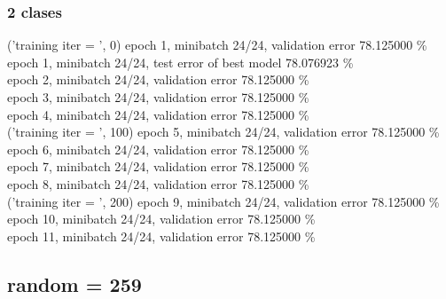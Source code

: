 \documentclass[a4paper]{article}
\begin{document}
\subsubsection{2 clases}
('training \@ iter = ', 0)
epoch 1, minibatch 24/24, validation error 78.125000 \% \\
     epoch 1, minibatch 24/24, test error of best model 78.076923 \% \\
epoch 2, minibatch 24/24, validation error 78.125000 \% \\
epoch 3, minibatch 24/24, validation error 78.125000 \% \\
epoch 4, minibatch 24/24, validation error 78.125000 \% \\
('training \@ iter = ', 100)
epoch 5, minibatch 24/24, validation error 78.125000 \% \\
epoch 6, minibatch 24/24, validation error 78.125000 \% \\
epoch 7, minibatch 24/24, validation error 78.125000 \% \\
epoch 8, minibatch 24/24, validation error 78.125000 \% \\
('training \@ iter = ', 200)
epoch 9, minibatch 24/24, validation error 78.125000 \% \\
epoch 10, minibatch 24/24, validation error 78.125000 \% \\
epoch 11, minibatch 24/24, validation error 78.125000 \% \\

\subsection{random = 259}
\end{document}
